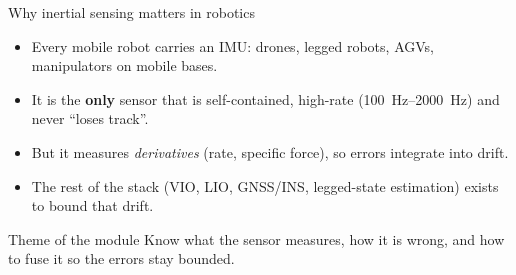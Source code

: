 \begin{frame}{Why inertial sensing matters in robotics}
  \begin{itemize}
    \item Every mobile robot carries an IMU: drones, legged robots, AGVs, manipulators on mobile bases.
    \item It is the \textbf{only} sensor that is self-contained, high-rate (\SIrange{100}{2000}{\hertz}) and never ``loses track''.
    \item But it measures \emph{derivatives} (rate, specific force), so errors integrate into drift.
    \item The rest of the stack (VIO, LIO, GNSS/INS, legged-state estimation) exists to bound that drift.
  \end{itemize}
  \vfill
  \begin{block}{Theme of the module}
    Know what the sensor measures, how it is wrong, and how to fuse it so the errors stay bounded.
  \end{block}
\end{frame}

